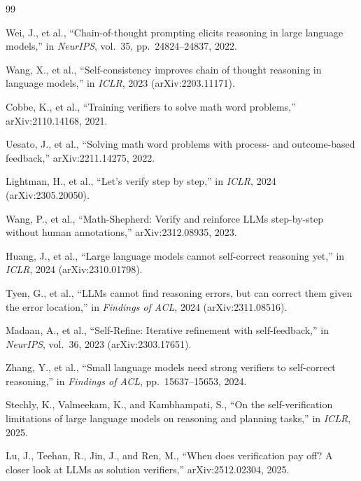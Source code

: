 \documentclass[11pt, a4paper]{article}
\begin{document}
{\footnotesize\setlength{\itemsep}{0pt}\setlength{\parskip}{0pt}
\begin{thebibliography}{99}

Wei, J., et al., ``Chain-of-thought prompting elicits reasoning in large language models,'' in \textit{NeurIPS}, vol.~35, pp.~24824--24837, 2022.

Wang, X., et al., ``Self-consistency improves chain of thought reasoning in language models,'' in \textit{ICLR}, 2023 (arXiv:2203.11171).

Cobbe, K., et al., ``Training verifiers to solve math word problems,'' arXiv:2110.14168, 2021.

Uesato, J., et al., ``Solving math word problems with process- and outcome-based feedback,'' arXiv:2211.14275, 2022.

Lightman, H., et al., ``Let's verify step by step,'' in \textit{ICLR}, 2024 (arXiv:2305.20050).

Wang, P., et al., ``Math-Shepherd: Verify and reinforce LLMs step-by-step without human annotations,'' arXiv:2312.08935, 2023.

Huang, J., et al., ``Large language models cannot self-correct reasoning yet,'' in \textit{ICLR}, 2024 (arXiv:2310.01798).

Tyen, G., et al., ``LLMs cannot find reasoning errors, but can correct them given the error location,'' in \textit{Findings of ACL}, 2024 (arXiv:2311.08516).

Madaan, A., et al., ``Self-Refine: Iterative refinement with self-feedback,'' in \textit{NeurIPS}, vol.~36, 2023 (arXiv:2303.17651).

Zhang, Y., et al., ``Small language models need strong verifiers to self-correct reasoning,'' in \textit{Findings of ACL}, pp.~15637--15653, 2024.

Stechly, K., Valmeekam, K., and Kambhampati, S., ``On the self-verification limitations of large language models on reasoning and planning tasks,'' in \textit{ICLR}, 2025.

Lu, J., Teehan, R., Jin, J., and Ren, M., ``When does verification pay off? A closer look at LLMs as solution verifiers,'' arXiv:2512.02304, 2025.


\end{thebibliography}}
\end{document}
